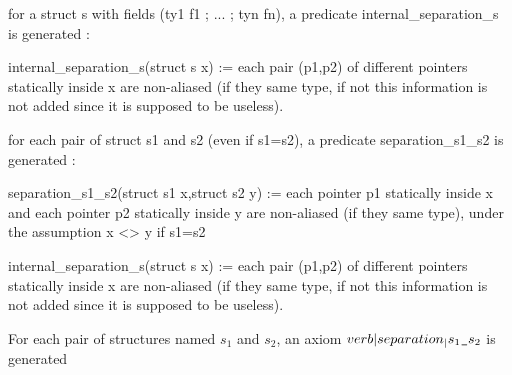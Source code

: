 for a struct s with fields (ty1 f1 ; ... ; tyn fn), a predicate
internal_separation_s is generated :

internal_separation_s(struct s x) := 
  each pair (p1,p2) of different pointers statically
  inside x are non-aliased (if they same type, if not this information
  is not added since it is supposed to be useless).

for each pair of struct s1 and s2 (even if s1=s2), a predicate
separation_s1_s2 is generated :

separation_s1_s2(struct s1 x,struct s2 y) := 
  each pointer p1 statically inside x and each
  pointer p2 statically inside y are non-aliased (if they same type),
  under the assumption x <> y if s1=s2

  

internal_separation_s(struct s x) := 
  each pair (p1,p2) of different pointers statically
  inside x are non-aliased (if they same type, if not this information
  is not added since it is supposed to be useless).







For each pair of structures named $s_1$ and $s_2$, an axiom 
$verb|separation_|s_1\verb|_|s_2$ is generated